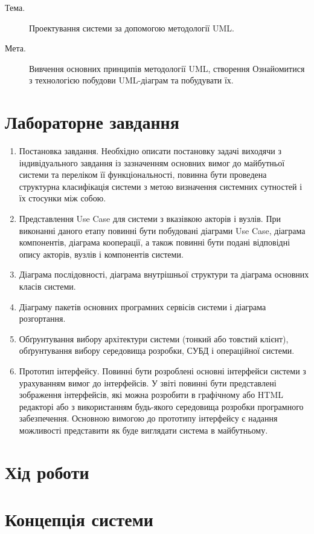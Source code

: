 \documentclass[oneside,14pt]{extarticle}
\newcommand\theme{Проектування системи за допомогою методології UML}
\newcommand\purpose{Вивчення основних принципів методології UML, створення Ознайомитися з технологією побудови UML-діаграм та побудувати їх}
\begin{document}
\begin{normalsize}
	\begin{description}
		\item[Тема.] \theme.
		\item[Мета.] \purpose.
	\end{description}

    \section*{Лабораторне завдання}
    \begin{enumerate}
    	\item Постановка завдання. Необхідно описати постановку задачі виходячи з індивідуального завдання із зазначенням основних вимог до майбутньої системи та переліком її функціональності, повинна бути проведена структурна класифікація системи з метою визначення системних сутностей і їх стосунки між собою.
    	\item Представлення Use Case для системи з вказівкою акторів і вузлів. При виконанні даного етапу повинні бути побудовані діаграми Use Case, діаграма компонентів, діаграма кооперації, а також повинні бути подані відповідні опису акторів, вузлів і компонентів системи.
    	\item Діаграма послідовності, діаграма внутрішньої структури та діаграма основних класів системи.
    	\item Діаграму пакетів основних програмних сервісів системи і діаграма розгортання.
    	\item Обґрунтування вибору архітектури системи (тонкий або товстий клієнт), обґрунтування вибору середовища розробки, СУБД і операційної системи.
    	\item Прототип інтерфейсу. Повинні бути розроблені основні інтерфейси системи з урахуванням вимог до інтерфейсів. У звіті повинні бути представлені зображення інтерфейсів, які можна розробити в графічному або HTML редакторі або з використанням будь-якого середовища розробки програмного забезпечення. Основною вимогою до прототипу інтерфейсу є надання можливості представити як буде виглядати система в майбутньому.
    \end{enumerate}
    
    \section*{Хід роботи}
    \section{Концепція системи}

\end{normalsize}
\end{document}
